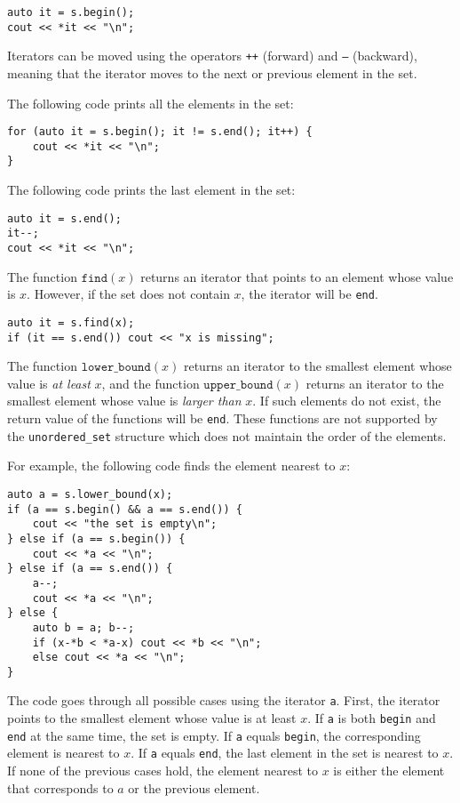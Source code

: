 \begin{lstlisting}
auto it = s.begin();
cout << *it << "\n";
\end{lstlisting}

Iterators can be moved using the operators
\texttt{++} (forward) and \texttt{---} (backward),
meaning that the iterator moves to the next
or previous element in the set.

The following code prints all the elements in the set:
\begin{lstlisting}
for (auto it = s.begin(); it != s.end(); it++) {
    cout << *it << "\n";
}
\end{lstlisting}
The following code prints the last element in the set:
\begin{lstlisting}
auto it = s.end();
it--;
cout << *it << "\n";
\end{lstlisting}

The function $\texttt{find}(x)$ returns an iterator
that points to an element whose value is $x$.
However, if the set does not contain $x$,
the iterator will be \texttt{end}.

\begin{lstlisting}
auto it = s.find(x);
if (it == s.end()) cout << "x is missing";
\end{lstlisting}

The function $\texttt{lower\_bound}(x)$ returns
an iterator to the smallest element
whose value is \emph{at least} $x$, and
the function $\texttt{upper\_bound}(x)$
returns an iterator to the smallest element
whose value is \emph{larger than} $x$.
If such elements do not exist,
the return value of the functions will be \texttt{end}.
These functions are not supported by the
\texttt{unordered\_set} structure which
does not maintain the order of the elements.

\begin{samepage}
For example, the following code finds the element
nearest to $x$:

\begin{lstlisting}
auto a = s.lower_bound(x);
if (a == s.begin() && a == s.end()) {
    cout << "the set is empty\n";
} else if (a == s.begin()) {
    cout << *a << "\n";
} else if (a == s.end()) {
    a--;
    cout << *a << "\n";
} else {
    auto b = a; b--;
    if (x-*b < *a-x) cout << *b << "\n";
    else cout << *a << "\n";
}
\end{lstlisting}

The code goes through all possible cases
using the iterator \texttt{a}.
First, the iterator points to the smallest
element whose value is at least $x$.
If \texttt{a} is both \texttt{begin}
and \texttt{end} at the same time, the set is empty.
If \texttt{a} equals \texttt{begin},
the corresponding element is nearest to $x$.
If \texttt{a} equals \texttt{end},
the last element in the set is nearest to $x$.
If none of the previous cases hold,
the element nearest to $x$ is either the
element that corresponds to $a$ or the previous element.
\end{samepage}

